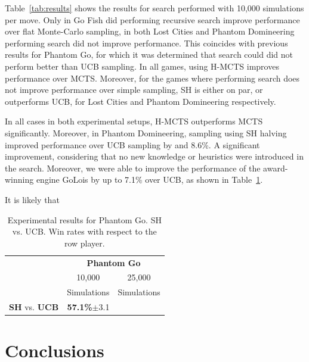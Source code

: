 \documentclass[a4paper]{llncs}
\begin{document}
Table~\ref{tab:results} shows the results for search performed with 10,000 simulations per move. Only in Go Fish did performing recursive search improve performance over flat Monte-Carlo sampling, in both Lost Cities and Phantom Domineering performing search did not improve performance. This coincides with previous results for Phantom Go, for which it was determined that search could did not perform better than UCB sampling. In all games, using H-MCTS improves performance over MCTS. Moreover, for the games where performing search does not improve performance over simple sampling, SH is either on par, or outperforms UCB, for Lost Cities and Phantom Domineering respectively.

In all cases in both experimental setups, H-MCTS outperforms MCTS significantly. Moreover, in Phantom Domineering, sampling using SH halving improved performance over UCB sampling by and 8.6\%. A significant improvement, considering that no new knowledge or heuristics were introduced in the search. Moreover, we were able to improve the performance of the award-winning engine {\sc GoLois} by up to 7.1\% over UCB, as shown in Table~\ref{tab:ph_go}.

It is likely that

\begin{table}[ht]
\centering
\setlength{\tabcolsep}{10pt}
\begin{tabular}{@{}lrr@{}}
\toprule
& \multicolumn{2}{c}{\textbf{Phantom Go}} \\
& \multicolumn{1}{c}{10,000} & \multicolumn{1}{c}{25,000} \\
& \multicolumn{1}{c}{Simulations} & \multicolumn{1}{c}{Simulations} \\ [1mm] \cmidrule(l){1-3}
\textbf{SH} vs. \textbf{UCB} &	\textbf{57.1\%}$\pm$3.1	&	\\ [.5mm]
\bottomrule
\end{tabular}
\vspace{2mm}
{\caption{Experimental results for Phantom Go. SH vs. UCB. Win rates with respect to the row player.} \label{tab:ph_go}}
\end{table}

\section{Conclusions}
\label{sec:concl}



\end{document}
